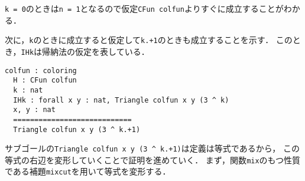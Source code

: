 {\tt{k = 0}}のときは{\tt{n = 1}}となるので仮定{\tt{CFun colfun}}よりすぐに成立することがわかる．

次に，{\tt{k}}のときに成立すると仮定して{\tt{k.+1}}のときも成立することを示す．
このとき，{\tt{IHk}}は帰納法の仮定を表している．
\begin{lstlisting}[language=Coq]
  colfun : coloring
  H : CFun colfun
  k : nat
  IHk : forall x y : nat, Triangle colfun x y (3 ^ k)
  x, y : nat
  ============================
  Triangle colfun x y (3 ^ k.+1)
\end{lstlisting}
サブゴールの{\tt{Triangle colfun x y (3 \verb|^| k.+1)}}は定義は等式であるから，
この等式の右辺を変形していくことで証明を進めていく．
まず，関数{\tt{mix}}のもつ性質である補題{\tt{mixcut}}を用いて等式を変形する．


